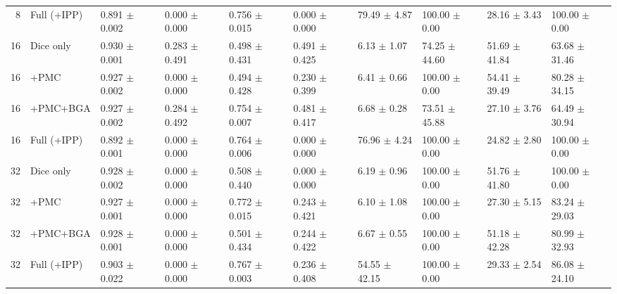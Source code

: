 \documentclass[10pt]{article}
\begin{document}
\begin{landscape}
{\begin{longtable}{r l l l l l l l l l}
8 & Full (+IPP) & 0.891 $\pm$ 0.002 & 0.000 $\pm$ 0.000 & 0.756 $\pm$ 0.015 & 0.000 $\pm$ 0.000 & 79.49 $\pm$ 4.87 & 100.00 $\pm$ 0.00 & 28.16 $\pm$ 3.43 & 100.00 $\pm$ 0.00 \\
16 & Dice only & 0.930 $\pm$ 0.001 & 0.283 $\pm$ 0.491 & 0.498 $\pm$ 0.431 & 0.491 $\pm$ 0.425 & 6.13 $\pm$ 1.07 & 74.25 $\pm$ 44.60 & 51.69 $\pm$ 41.84 & 63.68 $\pm$ 31.46 \\
16 & +PMC & 0.927 $\pm$ 0.002 & 0.000 $\pm$ 0.000 & 0.494 $\pm$ 0.428 & 0.230 $\pm$ 0.399 & 6.41 $\pm$ 0.66 & 100.00 $\pm$ 0.00 & 54.41 $\pm$ 39.49 & 80.28 $\pm$ 34.15 \\
16 & +PMC+BGA & 0.927 $\pm$ 0.002 & 0.284 $\pm$ 0.492 & 0.754 $\pm$ 0.007 & 0.481 $\pm$ 0.417 & 6.68 $\pm$ 0.28 & 73.51 $\pm$ 45.88 & 27.10 $\pm$ 3.76 & 64.49 $\pm$ 30.94 \\
16 & Full (+IPP) & 0.892 $\pm$ 0.001 & 0.000 $\pm$ 0.000 & 0.764 $\pm$ 0.006 & 0.000 $\pm$ 0.000 & 76.96 $\pm$ 4.24 & 100.00 $\pm$ 0.00 & 24.82 $\pm$ 2.80 & 100.00 $\pm$ 0.00 \\
32 & Dice only & 0.928 $\pm$ 0.002 & 0.000 $\pm$ 0.000 & 0.508 $\pm$ 0.440 & 0.000 $\pm$ 0.000 & 6.19 $\pm$ 0.96 & 100.00 $\pm$ 0.00 & 51.76 $\pm$ 41.80 & 100.00 $\pm$ 0.00 \\
32 & +PMC & 0.927 $\pm$ 0.001 & 0.000 $\pm$ 0.000 & 0.772 $\pm$ 0.015 & 0.243 $\pm$ 0.421 & 6.10 $\pm$ 1.08 & 100.00 $\pm$ 0.00 & 27.30 $\pm$ 5.15 & 83.24 $\pm$ 29.03 \\
32 & +PMC+BGA & 0.928 $\pm$ 0.001 & 0.000 $\pm$ 0.000 & 0.501 $\pm$ 0.434 & 0.244 $\pm$ 0.422 & 6.67 $\pm$ 0.55 & 100.00 $\pm$ 0.00 & 51.18 $\pm$ 42.28 & 80.99 $\pm$ 32.93 \\
32 & Full (+IPP) & 0.903 $\pm$ 0.022 & 0.000 $\pm$ 0.000 & 0.767 $\pm$ 0.003 & 0.236 $\pm$ 0.408 & 54.55 $\pm$ 42.15 & 100.00 $\pm$ 0.00 & 29.33 $\pm$ 2.54 & 86.08 $\pm$ 24.10 \\
\end{longtable}
}


\end{landscape}
\end{document}
